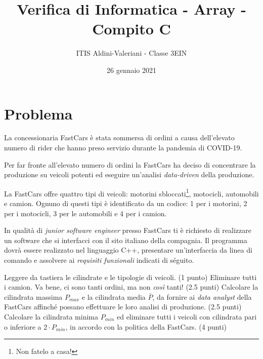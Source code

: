 \documentclass[a4paper, 11pt]{exam}
\title{Verifica di Informatica - Array - Compito C}
\author{ITIS Aldini-Valeriani - Classe 3EIN}
\date{26 gennaio 2021}
\begin{document}
\maketitle
\begin{center}

\end{center}
\vspace{1em}

\section*{Problema}

La concessionaria FastCars è stata sommersa di ordini a causa dell'elevato numero di rider che hanno preso servizio durante la pandemia di COVID-19.

Per far fronte all'elevato numero di ordini la FastCars ha deciso di concentrare la produzione su veicoli potenti ed eseguire un'analisi \textit{data-driven} della produzione.

La FastCars offre quattro tipi di veicoli: motorini sbloccati\footnote{Non fatelo a casa!}, motocicli, automobili e camion.
Ognuno di questi tipi è identificato da un codice: 1 per i motorini, 2 per i motocicli, 3 per le automobili e 4 per i camion.

In qualità di \textit{junior software engineer} presso FastCars ti è richiesto di realizzare un software che si interfacci con il sito italiano della compagnia.
Il programma dovrà essere realizzato nel linguaggio C++, presentare un'interfaccia da linea di comando e assolvere ai \textit{requisiti funzionali} indicati di séguito.

\begin{questions}
	\question Leggere da tastiera le cilindrate e le tipologie di veicoli. (1 punto)
	\question Eliminare tutti i camion. Va bene, ci sono tanti ordini, ma non \textit{così} tanti! (2.5 punti)
	\question Calcolare la cilindrata massima $P_{max}$ e la cilindrata media $\bar{P}$, da fornire ai \textit{data analyst} della FastCars affinché possano effettuare le loro analisi di produzione.  (2.5 punti)
	\question Calcolare la cilindrata minima $P_{min}$ ed eliminare tutti i veicoli con cilindrata pari o inferiore a $2 \cdot P_{min}$, in accordo con la politica della FastCars. (4 punti)
\end{questions}
\end{document}
